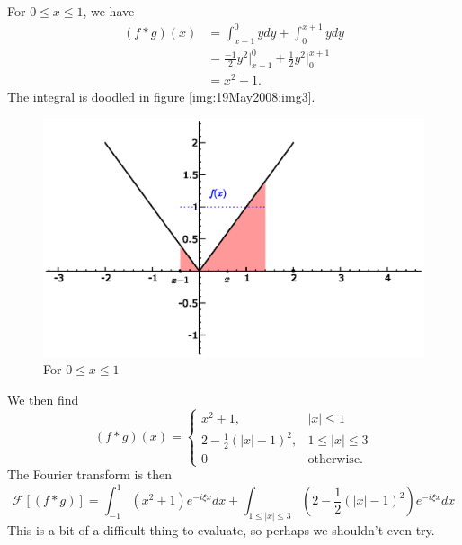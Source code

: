 \begin{ex}
For $0\leq x\leq 1$, we have
\begin{subequations}
\begin{align}
(f*g)(x) &= \int^{0}_{x-1}ydy + \int^{x+1}_{0}ydy\\
&= \frac{-1}{2}y^2\Big|^{0}_{x-1} +
  \frac{1}{2}y^2\Big|^{x+1}_{0}\\
&= x^2 + 1.
\end{align}
\end{subequations}
The integral is doodled in figure \eqref{img:19May2008:img3}.
\begin{figure}[hb!]
\includegraphics[width=\textwidth]{img/19May2008img3.eps}
\caption{For $0\leq x\leq 1$}\label{img:19May2008:img3}
\end{figure}

We then find
\begin{equation}
(f*g)(x) = \begin{cases} x^2+1, &|x|\leq1\\
2 - \frac{1}{2}(|x|-1)^2, & 1\leq|x|\leq3\\
0 &\text{otherwise}.
\end{cases}
\end{equation}
The Fourier transform is then
\begin{equation}
\mathcal{F}[(f*g)] = \int^{1}_{-1}( x^2+1)e^{-i\xi x}dx + \int_{1\leq|x|\leq3}(2
- \frac{1}{2}(|x|-1)^2)e^{-i\xi x}dx
\end{equation}
This is a bit of a difficult thing to evaluate, so perhaps
we shouldn't even try.


\end{ex}
